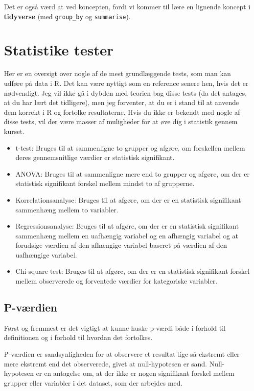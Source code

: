\documentclass[
]{book}
\begin{document}
Det er også værd at ved koncepten, fordi vi kommer til lære en lignende koncept i \textbf{tidyverse} (med \texttt{group\_by} og \texttt{summarise}).

\section{Statistike tester}\label{statistike-tester}

Her er en oversigt over nogle af de mest grundlæggende tests, som man kan udføre på data i R. Det kan være nyttigt som en reference senere hen, hvis det er nødvendigt. Jeg vil ikke gå i dybden med teorien bag disse tests (da det antages, at du har lært det tidligere), men jeg forventer, at du er i stand til at anvende dem korrekt i R og fortolke resultaterne. Hvis du ikke er bekendt med nogle af disse tests, vil der være masser af muligheder for at øve dig i statistik gennem kurset.

\begin{itemize}
\item
  t-test: Bruges til at sammenligne to grupper og afgøre, om forskellen mellem deres gennemsnitlige værdier er statistisk signifikant.
\item
  ANOVA: Bruges til at sammenligne mere end to grupper og afgøre, om der er statistisk signifikant forskel mellem mindst to af grupperne.
\item
  Korrelationsanalyse: Bruges til at afgøre, om der er en statistisk signifikant sammenhæng mellem to variabler.
\item
  Regressionsanalyse: Bruges til at afgøre, om der er en statistisk signifikant sammenhæng mellem en uafhængig variabel og en afhængig variabel og at forudsige værdien af den afhængige variabel baseret på værdien af den uafhængige variabel.
\item
  Chi-square test: Bruges til at afgøre, om der er en statistisk signifikant forskel mellem observerede og forventede værdier for kategoriske variabler.
\end{itemize}

\subsection{P-værdien}\label{p-vuxe6rdien}

Først og fremmest er det vigtigt at kunne huske p-værdi både i forhold til definitionen og i forhold til hvordan det fortolkes.

P-værdien er sandsynligheden for at observere et resultat lige så ekstremt eller mere ekstremt end det observerede, givet at null-hypotesen er sand. Null-hypotesen er en antagelse om, at der ikke er nogen signifikant forskel mellem grupper eller variabler i det dataset, som der arbejdes med.
\end{document}
